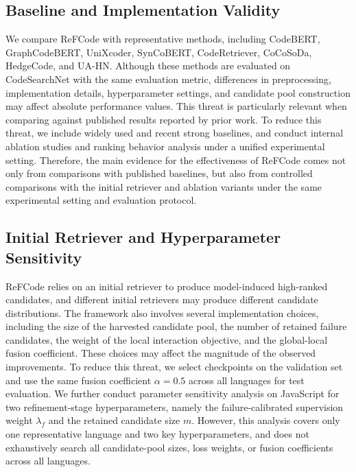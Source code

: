 \documentclass[10pt,conference]{IEEEtran}
\newcommand{\method}{ReFCode}
\begin{document}
\subsection{Baseline and Implementation Validity}

We compare \method{} with representative methods, including CodeBERT, GraphCodeBERT, UniXcoder, SynCoBERT, CodeRetriever, CoCoSoDa, HedgeCode, and UA-HN. 
Although these methods are evaluated on CodeSearchNet with the same evaluation metric, differences in preprocessing, implementation details, hyperparameter settings, and candidate pool construction may affect absolute performance values. 
This threat is particularly relevant when comparing against published results reported by prior work. 
To reduce this threat, we include widely used and recent strong baselines, and conduct internal ablation studies and ranking behavior analysis under a unified experimental setting. 
Therefore, the main evidence for the effectiveness of \method{} comes not only from comparisons with published baselines, but also from controlled comparisons with the initial retriever and ablation variants under the same experimental setting and evaluation protocol.

\subsection{Initial Retriever and Hyperparameter Sensitivity}

\method{} relies on an initial retriever to produce model-induced high-ranked candidates, and different initial retrievers may produce different candidate distributions. 
The framework also involves several implementation choices, including the size of the harvested candidate pool, the number of retained failure candidates, the weight of the local interaction objective, and the global-local fusion coefficient. 
These choices may affect the magnitude of the observed improvements. 
To reduce this threat, we select checkpoints on the validation set and use the same fusion coefficient \(\alpha=0.5\) across all languages for test evaluation. 
We further conduct parameter sensitivity analysis on JavaScript for two refinement-stage hyperparameters, namely the failure-calibrated supervision weight \(\lambda_f\) and the retained candidate size \(m\). 
However, this analysis covers only one representative language and two key hyperparameters, and does not exhaustively search all candidate-pool sizes, loss weights, or fusion coefficients across all languages.
\end{document}
